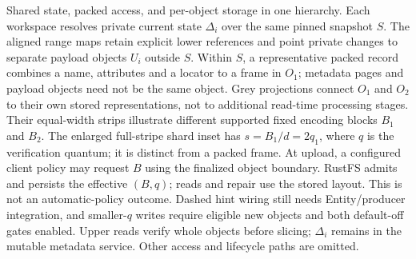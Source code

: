\caption{Shared state, packed access, and per-object storage in one hierarchy.
Each workspace resolves private current state $\Delta_i$ over the same pinned
snapshot $S$. The aligned range maps retain explicit lower references and
point private changes to separate payload objects $U_i$ outside $S$.
Within $S$, a representative packed record combines a name, attributes and
a locator to a frame in $O_1$; metadata pages and payload objects need not
be the same object. Grey projections connect $O_1$ and $O_2$ to their own
stored representations, not to additional read-time processing stages.
Their equal-width strips illustrate different supported fixed encoding
blocks $B_1$ and $B_2$. The enlarged full-stripe shard inset has
$s=B_1/d=2q_1$, where $q$ is the verification quantum; it is distinct from
a packed frame. At upload, a configured client policy may request $B$ using the
finalized object boundary. RustFS admits and persists the effective $(B,q)$;
reads and repair use the stored layout. This is not an automatic-policy
outcome. Dashed hint wiring still needs Entity/producer integration, and
smaller-$q$ writes require eligible new objects and both default-off gates
enabled. Upper reads verify whole objects before slicing; $\Delta_i$ remains
in the mutable metadata service. Other access and lifecycle paths are omitted.}
